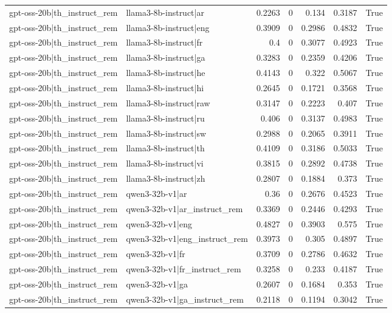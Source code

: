 \begin{table}
\begin{tabular}{l l r r r r l}
gpt-oss-20b|th_instruct_rem & llama3-8b-instruct|ar & 0.2263 & 0 & 0.134 & 0.3187 & True \\
gpt-oss-20b|th_instruct_rem & llama3-8b-instruct|eng & 0.3909 & 0 & 0.2986 & 0.4832 & True \\
gpt-oss-20b|th_instruct_rem & llama3-8b-instruct|fr & 0.4 & 0 & 0.3077 & 0.4923 & True \\
gpt-oss-20b|th_instruct_rem & llama3-8b-instruct|ga & 0.3283 & 0 & 0.2359 & 0.4206 & True \\
gpt-oss-20b|th_instruct_rem & llama3-8b-instruct|he & 0.4143 & 0 & 0.322 & 0.5067 & True \\
gpt-oss-20b|th_instruct_rem & llama3-8b-instruct|hi & 0.2645 & 0 & 0.1721 & 0.3568 & True \\
gpt-oss-20b|th_instruct_rem & llama3-8b-instruct|raw & 0.3147 & 0 & 0.2223 & 0.407 & True \\
gpt-oss-20b|th_instruct_rem & llama3-8b-instruct|ru & 0.406 & 0 & 0.3137 & 0.4983 & True \\
gpt-oss-20b|th_instruct_rem & llama3-8b-instruct|sw & 0.2988 & 0 & 0.2065 & 0.3911 & True \\
gpt-oss-20b|th_instruct_rem & llama3-8b-instruct|th & 0.4109 & 0 & 0.3186 & 0.5033 & True \\
gpt-oss-20b|th_instruct_rem & llama3-8b-instruct|vi & 0.3815 & 0 & 0.2892 & 0.4738 & True \\
gpt-oss-20b|th_instruct_rem & llama3-8b-instruct|zh & 0.2807 & 0 & 0.1884 & 0.373 & True \\
gpt-oss-20b|th_instruct_rem & qwen3-32b-v1|ar & 0.36 & 0 & 0.2676 & 0.4523 & True \\
gpt-oss-20b|th_instruct_rem & qwen3-32b-v1|ar_instruct_rem & 0.3369 & 0 & 0.2446 & 0.4293 & True \\
gpt-oss-20b|th_instruct_rem & qwen3-32b-v1|eng & 0.4827 & 0 & 0.3903 & 0.575 & True \\
gpt-oss-20b|th_instruct_rem & qwen3-32b-v1|eng_instruct_rem & 0.3973 & 0 & 0.305 & 0.4897 & True \\
gpt-oss-20b|th_instruct_rem & qwen3-32b-v1|fr & 0.3709 & 0 & 0.2786 & 0.4632 & True \\
gpt-oss-20b|th_instruct_rem & qwen3-32b-v1|fr_instruct_rem & 0.3258 & 0 & 0.233 & 0.4187 & True \\
gpt-oss-20b|th_instruct_rem & qwen3-32b-v1|ga & 0.2607 & 0 & 0.1684 & 0.353 & True \\
gpt-oss-20b|th_instruct_rem & qwen3-32b-v1|ga_instruct_rem & 0.2118 & 0 & 0.1194 & 0.3042 & True \\

\end{tabular}
\end{table}
